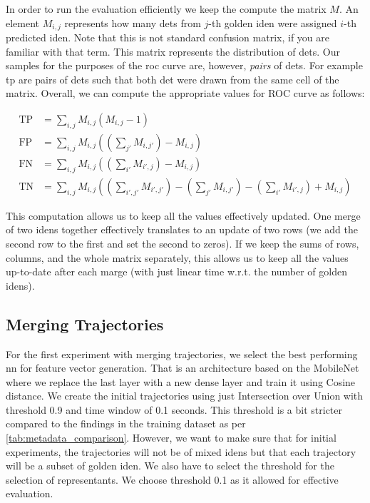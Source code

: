 In order to run the evaluation efficiently we keep the compute the matrix $M$. An element $M_{i,j}$ represents how many \glspl{det} from $j$-th golden \gls{iden} were assigned $i$-th predicted \gls{iden}. Note that this is not standard confusion matrix, if you are familiar with that term. This matrix represents the distribution of \glspl{det}. Our samples for the purposes of the \gls{roc} curve are, however, \emph{pairs} of \glspl{det}. For example \gls{tp} are pairs of \glspl{det} such that both \gls{det} were drawn from the same cell of the matrix. Overall, we can compute the appropriate values for ROC curve as follows:

\begin{align*}
    \mathrm{TP} &= \sum_{i,j} M_{i,j} (M_{i,j} - 1)\\
    \mathrm{FP} &= \sum_{i,j} M_{i,j} \left(\left(\sum_{j'}M_{i,j'}\right)-M_{i,j}\right)\\
    \mathrm{FN} &= \sum_{i,j} M_{i,j} \left(\left(\sum_{i'}M_{i',j}\right)-M_{i,j}\right)\\
    \mathrm{TN} &= \sum_{i,j} M_{i,j} \left(\left(\sum_{i',j'}M_{i',j'}\right) - \left(\sum_{j'}M_{i,j'}\right) - \left(\sum_{i'}M_{i',j}\right) + M_{i,j}\right)
\end{align*}

This computation allows us to keep all the values effectively updated. One merge of two \glspl{iden} together effectively translates to an update of two rows (we add the second row to the first and set the second to zeros). If we keep the sums of rows, columns, and the whole matrix separately, this allows us to keep all the values up-to-date after each marge (with just linear time w.r.t. the number of golden \glspl{iden}).

\subsection{Merging Trajectories}

For the first experiment with merging trajectories, we select the best performing \gls{nn} for feature vector generation. That is an architecture based on the MobileNet where we replace the last layer with a new dense layer and train it using Cosine distance. We create the initial trajectories using just Intersection over Union with threshold 0.9 and time window of 0.1 seconds. This threshold is a bit stricter compared to the findings in the training dataset as per 
\autoref{tab:metadata_comparison}. However, we want to make sure that for initial experiments, the trajectories will not be of mixed \glspl{iden} but that each trajectory will be a subset of golden \gls{iden}. We also have to select the threshold for the selection of representants. We choose threshold 0.1 as it allowed for effective evaluation.


